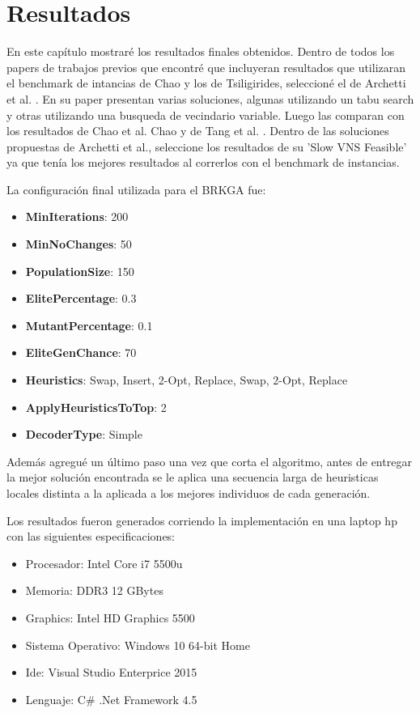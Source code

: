 \chapter{Resultados}

En este capítulo mostraré los resultados finales obtenidos. Dentro de todos los papers de trabajos previos que encontré que incluyeran resultados que utilizaran el benchmark de intancias de Chao y los de Tsiligirides, seleccioné el de Archetti et al. \cite{ArchettiHertzSperanza}. En su paper presentan varias soluciones, algunas utilizando un tabu search y otras utilizando una busqueda de vecindario variable. Luego las comparan con los resultados de Chao et al. Chao \cite{ChaoGoldenWasil} y de Tang et al. \cite{TangMillerHooks}. Dentro de las soluciones propuestas de Archetti et al., seleccione los resultados de su 'Slow VNS Feasible' ya que tenía los mejores resultados al correrlos con el benchmark de instancias. 

\bigskip

La configuración final utilizada para el BRKGA fue:

\begin{itemize}
  \item \textbf{MinIterations}: 200
  \item \textbf{MinNoChanges}: 50
  \item \textbf{PopulationSize}: 150
  \item \textbf{ElitePercentage}: 0.3 
  \item \textbf{MutantPercentage}: 0.1
  \item \textbf{EliteGenChance}: 70 
  \item \textbf{Heuristics}: Swap, Insert, 2-Opt, Replace, Swap, 2-Opt, Replace
  \item \textbf{ApplyHeuristicsToTop}: 2
  \item \textbf{DecoderType}: Simple
\end{itemize}

Además agregué un último paso una vez que corta el algoritmo, antes de entregar la mejor solución encontrada se le aplica una secuencia larga de heuristicas locales distinta a la aplicada a los mejores individuos de cada generación.

\bigskip

Los resultados fueron generados corriendo la implementación en una laptop hp con las siguientes especificaciones:

\begin{itemize}
  \item Procesador: Intel Core i7 5500u
  \item Memoria: DDR3 12 GBytes
  \item Graphics: Intel HD Graphics 5500
  \item Sistema Operativo: Windows 10 64-bit Home
  \item Ide: Visual Studio Enterprice 2015
  \item Lenguaje: C\# .Net Framework 4.5
\end{itemize}

